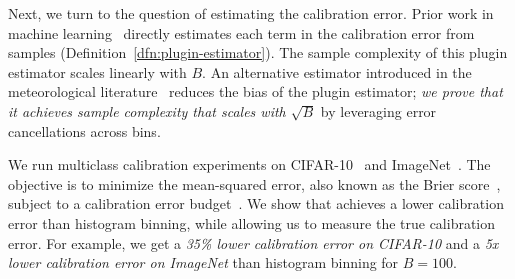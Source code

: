 Next, we turn to the question of estimating the calibration error. Prior work in machine learning~\cite{nguyen2015posterior, guo2017calibration, hendrycks2019anomaly, kuleshov2015calibrated, hendrycks2019pretraining} directly estimates each term in the calibration error from samples (Definition~\ref{dfn:plugin-estimator}). The sample complexity of this plugin estimator scales linearly with $B$. An alternative estimator introduced in the meteorological literature~\cite{brocker2012empirical, ferro2012bias} reduces the bias of the plugin estimator; \emph{we prove that it achieves sample complexity that scales with $\sqrt{B}$} by leveraging error cancellations across bins.

We run multiclass calibration experiments on CIFAR-10~\cite{krizhevsky2009learningmultiple} and ImageNet~\cite{deng2009imagenet}.
The objective is to minimize the mean-squared error, also known as the Brier score~\cite{brier1950verification}, subject to a calibration error budget~\cite{gneiting2005weather}.
We show that \ourcal{} achieves a lower calibration error than histogram binning, while allowing us to measure the true calibration error.
For example, we get a \emph{35\% lower calibration error on CIFAR-10} and a \emph{5x lower calibration error on ImageNet} than histogram binning for $B = 100$.




